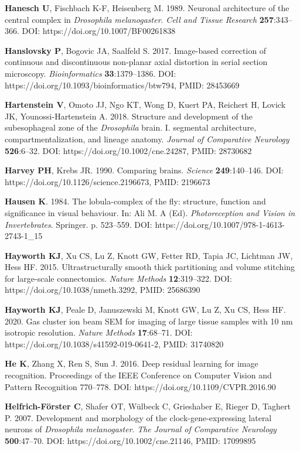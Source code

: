 \documentclass{article}
\begin{document}
\begin{hangpars}
\textbf{Hanesch U}, Fischbach K-F, Heisenberg M. 1989. Neuronal architecture of the central complex in \emph{Drosophila} \emph{melanogaster}. \emph{Cell and Tissue Research} \textbf{257}:343–366. DOI: https://doi.org/10.1007/BF00261838

\textbf{Hanslovsky P}, Bogovic JA, Saalfeld S. 2017. Image-based correction of continuous and discontinuous non-planar axial distortion in serial section microscopy. \emph{Bioinformatics} \textbf{33}:1379–1386. DOI: https://doi.org/10.1093/bioinformatics/btw794, PMID: 28453669

\textbf{Hartenstein V}, Omoto JJ, Ngo KT, Wong D, Kuert PA, Reichert H, Lovick JK, Younossi-Hartenstein A. 2018. Structure and development of the subesophageal zone of the \emph{Drosophila} brain. I. segmental architecture, compartmentalization, and lineage anatomy. \emph{Journal of Comparative Neurology} \textbf{526}:6–32. DOI: https://doi.org/10.1002/cne.24287, PMID: 28730682

\textbf{Harvey PH}, Krebs JR. 1990. Comparing brains. \emph{Science} \textbf{249}:140–146. DOI: https://doi.org/10.1126/science.2196673, PMID: 2196673

\textbf{Hausen K}. 1984. The lobula-complex of the fly: structure, function and significance in visual behaviour. In: Ali M. A (Ed). \emph{Photoreception and Vision in Invertebrates}. Springer. p. 523–559. DOI: https://doi.org/10.1007/978-1-4613-2743-1\_15

\textbf{Hayworth KJ}, Xu CS, Lu Z, Knott GW, Fetter RD, Tapia JC, Lichtman JW, Hess HF. 2015. Ultrastructurally smooth thick partitioning and volume stitching for large-scale connectomics. \emph{Nature Methods} \textbf{12}:319–322. DOI: https://doi.org/10.1038/nmeth.3292, PMID: 25686390

\textbf{Hayworth KJ}, Peale D, Januszewski M, Knott GW, Lu Z, Xu CS, Hess HF. 2020. Gas cluster ion beam SEM for imaging of large tissue samples with 10 nm isotropic resolution. \emph{Nature Methods} \textbf{17}:68–71. DOI: https://doi.org/10.1038/s41592-019-0641-2, PMID: 31740820

\textbf{He K}, Zhang X, Ren S, Sun J. 2016. Deep residual learning for image recognition. Proceedings of the IEEE Conference on Computer Vision and Pattern Recognition 770–778. DOI: https://doi.org/10.1109/CVPR.2016.90

\textbf{Helfrich-Förster C}, Shafer OT, Wülbeck C, Grieshaber E, Rieger D, Taghert P. 2007. Development and morphology of the clock-gene-expressing lateral neurons of \emph{Drosophila melanogaster}. \emph{The Journal of} \emph{Comparative Neurology} \textbf{500}:47–70. DOI: https://doi.org/10.1002/cne.21146, PMID: 17099895


\end{hangpars}
\end{document}
